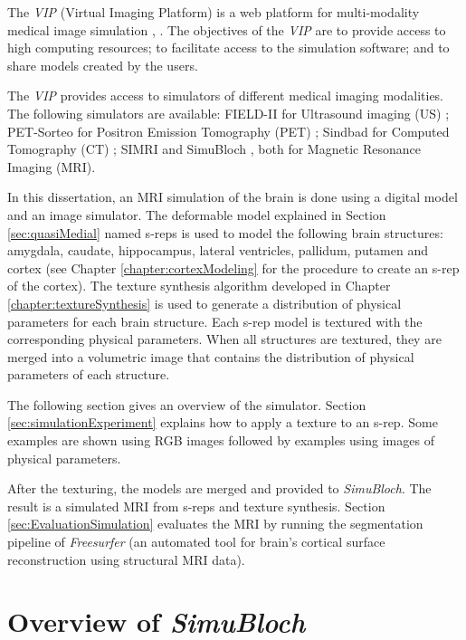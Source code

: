 The \textit{VIP} (Virtual Imaging Platform) is a web platform for multi-modality medical image simulation \cite{marion2011multi}, \cite{glatard2011virtual}. 
The objectives of the \textit{VIP} are to provide access to high computing resources; to facilitate access to the simulation software;
and to share models created by the users. 

The \textit{VIP} provides access to simulators of different medical imaging modalities. 
The following simulators are available: 
FIELD-II for Ultrasound imaging (US) \cite{jensen2004simulation}; 
PET-Sorteo for Positron Emission Tomography (PET) \cite{reilhac2004pet}; Sindbad for Computed Tomography (CT) \cite{tabary2009realistic}; 
SIMRI \cite{benoit2005simri} and SimuBloch \cite{caom3}, both for Magnetic Resonance Imaging (MRI).

In this dissertation, an MRI simulation of the brain is done using a digital model and an image simulator.
The deformable model explained in Section \ref{sec:quasiMedial} named s-reps is used 
to model the following brain structures: 
amygdala, caudate, hippocampus,  lateral ventricles, pallidum, putamen and cortex (see Chapter \ref{chapter:cortexModeling} for the procedure to create an s-rep of the cortex).
The texture synthesis algorithm developed in Chapter \ref{chapter:textureSynthesis} is used 
to generate a distribution of physical parameters for each brain structure. 
Each s-rep model is textured with the corresponding physical parameters. 
When all structures are textured, they are merged into a volumetric image 
that contains the distribution of physical parameters of each structure.

The following section gives an overview of the simulator. 
Section \ref{sec:simulationExperiment} explains how to apply a texture to an s-rep.
Some examples are shown using RGB images followed by examples using images of physical parameters. 

After the texturing, the models are merged and provided to \textit{SimuBloch}.
The result is a simulated MRI from s-reps and texture synthesis.
Section \ref{sec:EvaluationSimulation} evaluates the MRI by running the segmentation 
pipeline of \textit{Freesurfer} (an automated tool for brain's cortical surface reconstruction using structural MRI data).

\section{Overview of \textit{SimuBloch}}
\label{sec:simulationDeformable}

